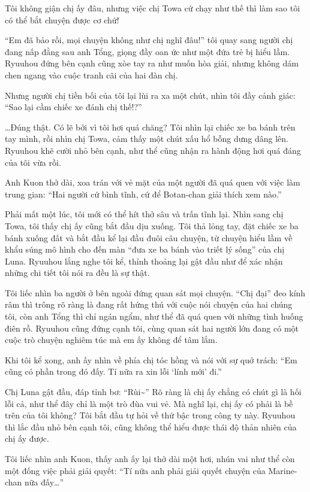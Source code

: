\documentclass[../main.tex]{subfiles}
\begin{document}
Tôi không giận chị ấy đâu, nhưng việc chị Towa cứ chạy như thế thì làm sao tôi có thể bắt chuyện được cơ chứ!

``Em đã bảo rồi, mọi chuyện không như chị nghĩ đâu!'' tôi quay sang người chị đang nấp đằng sau anh Tổng, giọng đầy oan ức như một đứa trẻ bị hiểu lầm. Ryuuhou đứng bên cạnh cũng xòe tay ra như muốn hòa giải, nhưng không dám chen ngang vào cuộc tranh cãi của hai đàn chị.

Nhưng người chị tiền bối của tôi lại lùi ra xa một chút, nhìn tôi đầy cảnh giác: ``Sao lại cầm chiếc xe đánh chị thế!?''

\dots Đúng thật. Có lẽ bởi vì tôi hơi quá chăng? Tôi nhìn lại chiếc xe ba bánh trên tay mình, rồi nhìn chị Towa, cảm thấy một chút xấu hổ bỗng dưng dâng lên. Ryuuhou khẽ cười nhỏ bên cạnh, như thể cũng nhận ra hành động hơi quá đáng của tôi vừa rồi.

Anh Kuon thở dài, xoa trán với vẻ mặt của một người đã quá quen với việc làm trung gian: ``Hai người cứ bình tĩnh, cứ để Botan-chan giải thích xem nào.''

Phải mất một lúc, tôi mới có thể hít thở sâu và trấn tĩnh lại. Nhìn sang chị Towa, tôi thấy chị ấy cũng bắt đầu dịu xuống. Tôi thả lỏng tay, đặt chiếc xe ba bánh xuống đất và bắt đầu kể lại đầu đuôi câu chuyện, từ chuyện hiểu lầm về khẩu súng mô hình cho đến màn ``đưa xe ba bánh vào triết lý sống'' của chị Luna. Ryuuhou lắng nghe tôi kể, thỉnh thoảng lại gật đầu như để xác nhận những chi tiết tôi nói ra đều là sự thật.

Tôi liếc nhìn ba người ở bên ngoài đứng quan sát mọi chuyện. ``Chị đại'' đeo kính râm thì trông rõ ràng là đang rất hứng thú với cuộc nói chuyện của hai chúng tôi, còn anh Tổng thì chỉ ngán ngẩm, như thể đã quá quen với những tình huống điên rồ. Ryuuhou cũng đứng cạnh tôi, cùng quan sát hai người lớn đang có một cuộc trò chuyện nghiêm túc mà em ấy không để tâm lắm.

Khi tôi kể xong, anh ấy nhìn về phía chị tóc hồng và nói với sự quở trách: ``Em cũng có phần trong đó đấy. Tí nữa ra xin lỗi `lính mới' đi.''

Chị Luna gật đầu, đáp tỉnh bơ: ``Rùi\~{}'' Rõ ràng là chị ấy chẳng có chút gì là hối lỗi cả, như thể đây chỉ là một trò đùa vui vẻ. Mà nghĩ lại, chị ấy có phải là bề trên của tôi không? Tôi bắt đầu tự hỏi về thứ bậc trong công ty này. Ryuuhou thì lắc đầu nhỏ bên cạnh tôi, cũng không thể hiểu được thái độ thản nhiên của chị ấy được.

Tôi liếc nhìn anh Kuon, thấy anh ấy lại thở dài một hơi, nhún vai như thể còn một đống việc phải giải quyết: ``Tí nữa anh phải giải quyết chuyện của Marine-chan nữa đấy\dots''
\end{document}
